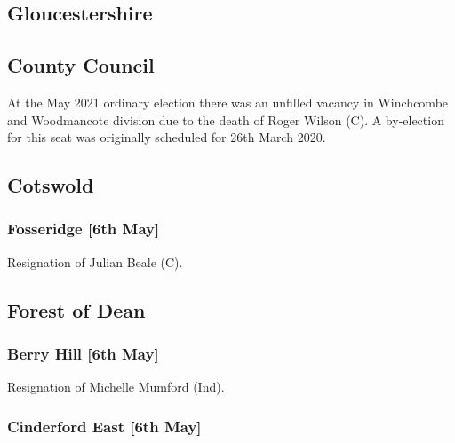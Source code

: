 \documentclass[a4paper,openany]{book}
\begin{document}
\begin{resultsiii}
\section{Gloucestershire}

\subsection*{County Council}

At the May 2021 ordinary election there was an unfilled vacancy in Winchcombe and Woodmancote division due to the death of Roger Wilson (C).  A by-election for this seat was originally scheduled for 26th March 2020.

\subsection*{Cotswold}

\subsubsection*{Fosseridge \hspace*{\fill}\nolinebreak[1]%
	\enspace\hspace*{\fill}
	[6th May]}


Resignation of Julian Beale (C).

\subsection*{Forest of Dean}

\subsubsection*{Berry Hill \hspace*{\fill}\nolinebreak[1]%
	\enspace\hspace*{\fill}
	[6th May]}


Resignation of Michelle Mumford (Ind).

\subsubsection*{Cinderford East \hspace*{\fill}\nolinebreak[1]%
	\enspace\hspace*{\fill}
	[6th May]}


\end{resultsiii}
\end{document}
